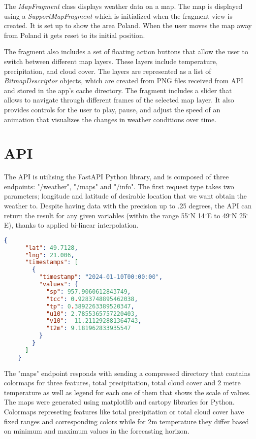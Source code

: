  The \textit{MapFragment} class displays weather data on a map. The map is displayed using a \textit{SupportMapFragment} which is initialized when the fragment view is created. It is set up to show the area Poland. When the user moves the map away from Poland it gets reset to its initial position.



The fragment also includes a set of floating action buttons that allow the user to switch between different map layers. These layers include temperature, precipitation, and cloud cover. The layers are represented as a list of \textit{BitmapDescriptor} objects, which are created from PNG files received from API and stored in the app's cache directory. The fragment includes a slider that allows to navigate through different frames of the selected map layer. It also provides controls for the user to play, pause, and adjust the speed of an animation that visualizes the changes in weather conditions over time.

\section{API}

\noindent The API is utilising the FastAPI \cite{fastapi} Python library, and is composed of three endpoints: "/weather", "/maps" and "/info". The first request type takes two parameters; longitude and latitude of desirable location that we want obtain the weather to. Despite having data with the precision up to .25 degrees, the API can return the result for any given variables (within the range 55$^{\circ}$N 14$^{\circ}$E to 49$^{\circ}$N 25$^{\circ}$E), thanks to applied bi-linear interpolation. 

    \begin{lstlisting}[language=json]
    {
      "lat": 49.7128,
      "lng": 21.006,
      "timestamps": [
        {
          "timestamp": "2024-01-10T00:00:00",
          "values": {
            "sp": 957.9060612843749,
            "tcc": 0.9283748895462038,
            "tp": 0.3892263389520347,
            "u10": 2.7855365757220403,
            "v10": -11.211292881364743,
            "t2m": 9.181962833935547
          }
        }
      ]
    }
    \end{lstlisting}

\noindent The "maps" endpoint responds with sending a compressed directory that contains colormaps for three features, total precipitation, total cloud cover and 2 metre temperature as well as legend for each one of them that shows the scale of values. The maps were generated using matplotlib \cite{Hunter:2007} and cartopy \cite{Cartopy} libraries for Python. Colormaps represeting features like total precipitation or total cloud cover have fixed ranges and corresponding colors while for 2m temperature they differ based on minimum and maximum values in the forecasting horizon.

